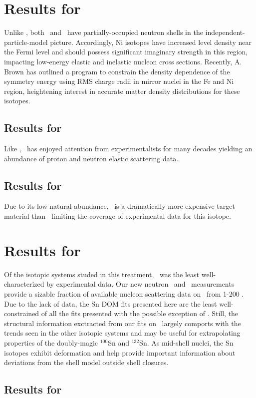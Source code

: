 \section{Results for \niEightFour}
Unlike \caAughtEight, both \niEight\ and \niFour\ have partially-occupied neutron shells in the
independent-particle-model picture. Accordingly, Ni isotopes have increased level density near the
Fermi level and should possess significant imaginary strength in this region, impacting
low-energy elastic and inelastic nucleon cross sections. Recently, A. Brown has outlined a
program to constrain the density dependence of the symmetry energy using RMS charge radii in mirror
nuclei in the Fe and Ni region, heightening interest in accurate
matter density distributions for these isotopes.
\subsection{Results for \niEight}
Like \caForty, \niEight\ has enjoyed attention from experimentalists for many decades yielding
an abundance of proton and neutron elastic scattering data.
\subsection{Results for \niFour}
Due to its low natural abundance, \niFour\ is a dramatically more expensive target material than
\niEight\, limiting the coverage of experimental data for this isotope.

\section{Results for \snTwelveFour}
Of the isotopic systems studed in this treatment, \snTwelveFour\ was the least well-characterized by
experimental data. Our new neutron \tot\ and \el\ measurements provide a sizable fraction
of available nucleon scattering data on \snTwelveFour\ from 1-200 \mega\electronvolt. Due to the
lack of data, the Sn DOM fits presented here are the least well-constrained of all the fits
presented with the possible exception of \niFour. Still, the structural information exctracted from
our fits on \snTwelveFour\ largely comports with the trends seen in the other isotopic systems and
may be useful for extrapolating properties of the doubly-magic $^{100}$Sn and $^{132}$Sn. As
mid-shell nuclei, the Sn isotopes exhibit deformation and help provide important information
about deviations from the shell model outside shell closures. 
\subsection{Results for \snTwelve}
